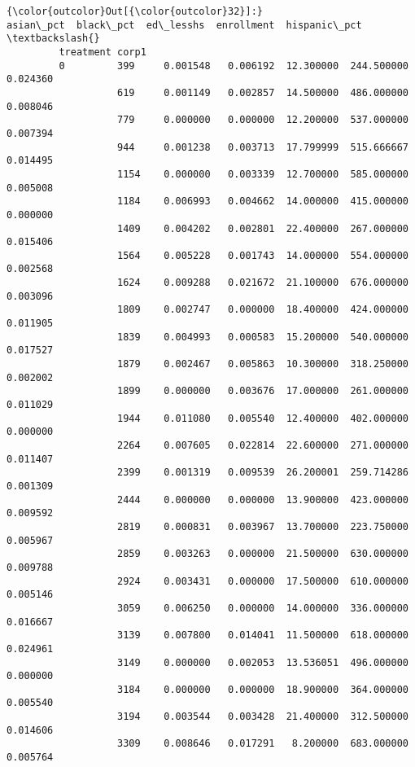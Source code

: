 \documentclass[11pt]{article}
\begin{document}
\begin{Verbatim}[commandchars=\\\{\}]
{\color{outcolor}Out[{\color{outcolor}32}]:}                  asian\_pct  black\_pct  ed\_lesshs  enrollment  hispanic\_pct  \textbackslash{}
         treatment corp1                                                              
         0         399     0.001548   0.006192  12.300000  244.500000      0.024360   
                   619     0.001149   0.002857  14.500000  486.000000      0.008046   
                   779     0.000000   0.000000  12.200000  537.000000      0.007394   
                   944     0.001238   0.003713  17.799999  515.666667      0.014495   
                   1154    0.000000   0.003339  12.700000  585.000000      0.005008   
                   1184    0.006993   0.004662  14.000000  415.000000      0.000000   
                   1409    0.004202   0.002801  22.400000  267.000000      0.015406   
                   1564    0.005228   0.001743  14.000000  554.000000      0.002568   
                   1624    0.009288   0.021672  21.100000  676.000000      0.003096   
                   1809    0.002747   0.000000  18.400000  424.000000      0.011905   
                   1839    0.004993   0.000583  15.200000  540.000000      0.017527   
                   1879    0.002467   0.005863  10.300000  318.250000      0.002002   
                   1899    0.000000   0.003676  17.000000  261.000000      0.011029   
                   1944    0.011080   0.005540  12.400000  402.000000      0.000000   
                   2264    0.007605   0.022814  22.600000  271.000000      0.011407   
                   2399    0.001319   0.009539  26.200001  259.714286      0.001309   
                   2444    0.000000   0.000000  13.900000  423.000000      0.009592   
                   2819    0.000831   0.003967  13.700000  223.750000      0.005967   
                   2859    0.003263   0.000000  21.500000  630.000000      0.009788   
                   2924    0.003431   0.000000  17.500000  610.000000      0.005146   
                   3059    0.006250   0.000000  14.000000  336.000000      0.016667   
                   3139    0.007800   0.014041  11.500000  618.000000      0.024961   
                   3149    0.000000   0.002053  13.536051  496.000000      0.000000   
                   3184    0.000000   0.000000  18.900000  364.000000      0.005540   
                   3194    0.003544   0.003428  21.400000  312.500000      0.014606   
                   3309    0.008646   0.017291   8.200000  683.000000      0.005764   

\end{Verbatim}
\end{document}
